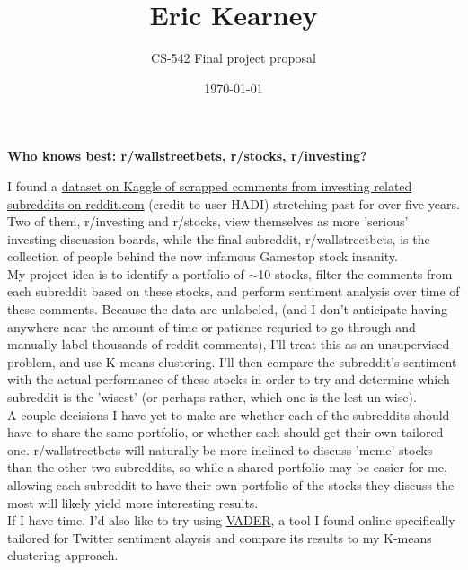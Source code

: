 \documentclass[11pt]{article}
\title{Eric Kearney}
\author{CS-542 Final project proposal}
\date{\today}
\begin{document}
\maketitle
\thispagestyle{empty}

\begin{center}
    \noindent\textbf{Who knows best: r/wallstreetbets, r/stocks, r/investing?}\\
\end{center}

I found a \href{https://www.kaggle.com/datasets/yorkehead/stock-market-subreddits}{dataset on Kaggle of scrapped comments from investing related subreddits on reddit.com} (credit to user HADI) stretching past for over five years. Two of them, r/investing and r/stocks, view themselves as more 'serious' investing discussion boards, while the final subreddit, r/wallstreetbets, is the collection of people behind the now infamous Gamestop stock insanity.\\

My project idea is to identify a portfolio of $\sim$10 stocks, filter the comments from each subreddit based on these stocks, and perform sentiment analysis over time of these comments. Because the data are unlabeled, (and I don't anticipate having anywhere near the amount of time or patience requried to go through and manually label thousands of reddit comments), I'll treat this as an unsupervised problem, and use K-means clustering.  I'll then compare the subreddit's sentiment with the actual performance of these stocks in order to try and determine which subreddit is the 'wisest' (or perhaps rather, which one is the lest un-wise).\\

A couple decisions I have yet to make are whether each of the subreddits should have to share the same portfolio, or whether each should get their own tailored one. r/wallstreetbets will naturally be more inclined to discuss 'meme' stocks than the other two subreddits, so while a shared portfolio may be easier for me, allowing each subreddit to have their own portfolio of the stocks they discuss the most will likely yield more interesting results.\\

If I have time, I'd also like to try using \href{https://github.com/cjhutto/vaderSentiment}{VADER}, a tool I found online specifically tailored for Twitter sentiment alaysis and compare its results to my K-means clustering approach.
\end{document}
